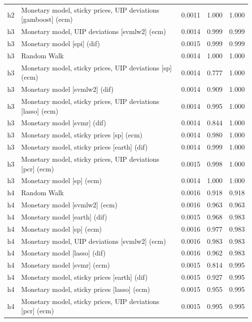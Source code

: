 \begin{ThreePartTable}
\begin{longtable}[t]{cp{5.5cm}ccc}
h2 & \raggedright Monetary model, sticky prices, UIP deviations [gamboost] (ecm) & 0.0011 & 1.000 & 1.000\\
\addlinespace
h3 & \raggedright Monetary model, UIP deviations [svmlw2] (ecm) & 0.0014 & 0.999 & 0.999\\
h3 & \raggedright Monetary model [spi] (dif) & 0.0015 & 0.999 & 0.999\\
h3 & \raggedright Random Walk & 0.0014 & 1.000 & 1.000\\
h3 & \raggedright Monetary model, sticky prices, UIP deviations [sp] (ecm) & 0.0014 & 0.777 & 1.000\\
h3 & \raggedright Monetary model [svmlw2] (dif) & 0.0014 & 0.909 & 1.000\\
h3 & \raggedright Monetary model, sticky prices, UIP deviations [lasso] (ecm) & 0.0014 & 0.995 & 1.000\\
h3 & \raggedright Monetary model [svmr] (dif) & 0.0014 & 0.844 & 1.000\\
h3 & \raggedright Monetary model, sticky prices [sp] (ecm) & 0.0014 & 0.980 & 1.000\\
h3 & \raggedright Monetary model, sticky prices [earth] (dif) & 0.0014 & 0.999 & 1.000\\
h3 & \raggedright Monetary model, sticky prices, UIP deviations [pcr] (ecm) & 0.0015 & 0.998 & 1.000\\
h3 & \raggedright Monetary model [sp] (ecm) & 0.0014 & 1.000 & 1.000\\
\addlinespace
h4 & \raggedright Random Walk & 0.0016 & 0.918 & 0.918\\
h4 & \raggedright Monetary model [svmlw2] (ecm) & 0.0016 & 0.963 & 0.963\\
h4 & \raggedright Monetary model [earth] (dif) & 0.0015 & 0.968 & 0.983\\
h4 & \raggedright Monetary model [sp] (ecm) & 0.0016 & 0.977 & 0.983\\
h4 & \raggedright Monetary model, UIP deviations [svmlw2] (ecm) & 0.0016 & 0.983 & 0.983\\
h4 & \raggedright Monetary model [lasso] (dif) & 0.0016 & 0.962 & 0.983\\
h4 & \raggedright Monetary model [svmr] (ecm) & 0.0015 & 0.814 & 0.995\\
h4 & \raggedright Monetary model, sticky prices [earth] (dif) & 0.0015 & 0.927 & 0.995\\
h4 & \raggedright Monetary model, sticky prices [lasso] (ecm) & 0.0015 & 0.955 & 0.995\\
h4 & \raggedright Monetary model, sticky prices, UIP deviations [pcr] (ecm) & 0.0015 & 0.995 & 0.995\\

\end{longtable}
\end{ThreePartTable}
